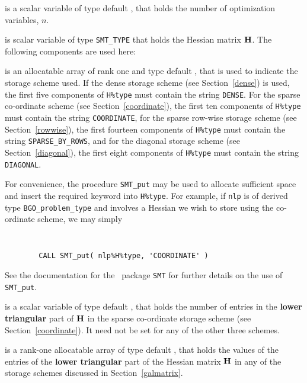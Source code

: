 \documentclass{galahad}
\newcommand{\packagename}{BGO}
\begin{document}
\begin{description}

 is a scalar variable of type default \integer,
 that holds the number of optimization variables, $n$.

 is scalar variable of type {\tt SMT\_TYPE}
that holds the Hessian matrix ${\mathbf{H}}$. The following components
are used here:

\begin{description}

 is an allocatable array of rank one and type default
\character, that
is used to indicate the storage scheme used. If the dense storage scheme
(see Section~\ref{dense}) is used,
the first five components of {\tt H\%type} must contain the
string {\tt DENSE}.
For the sparse co-ordinate scheme (see Section~\ref{coordinate}),
the first ten components of {\tt H\%type} must contain the
string {\tt COORDINATE},
for the sparse row-wise storage scheme (see Section~\ref{rowwise}),
the first fourteen components of {\tt H\%type} must contain the
string {\tt SPARSE\_BY\_ROWS},
and for the diagonal storage scheme (see Section~\ref{diagonal}),
the first eight components of {\tt H\%type} must contain the
string {\tt DIAGONAL}.

For convenience, the procedure {\tt SMT\_put}
may be used to allocate sufficient space and insert the required keyword
into {\tt H\%type}.
For example, if {\tt nlp} is of derived type {\tt \packagename\_problem\_type}
and involves a Hessian we wish to store using the co-ordinate scheme,
we may simply
{\tt
\begin{verbatim}
        CALL SMT_put( nlp%H%type, 'COORDINATE' )
\end{verbatim}
}
\noindent
See the documentation for the \galahad\ package {\tt SMT}
for further details on the use of {\tt SMT\_put}.

 is a scalar variable of type default \integer, that
holds the number of entries in the {\bf lower triangular} part of ${\mathbf{H}}$
in the sparse co-ordinate storage scheme (see Section~\ref{coordinate}).
It need not be set for any of the other three schemes.

 is a rank-one allocatable array of type default \realdp, that holds
the values of the entries of the {\bf lower triangular} part
of the Hessian matrix ${\mathbf{H}}$ in any of the
storage schemes discussed in Section~\ref{galmatrix}.


\end{description}
\end{description}
\end{document}
